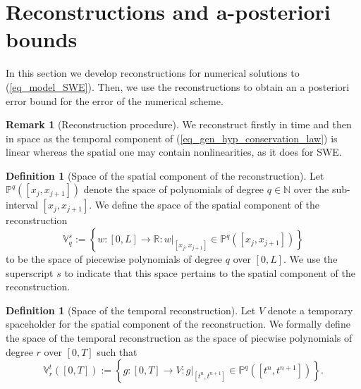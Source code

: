 \documentclass[12pt,a4paper]{article}
\numberwithin{equation}{section}
\theoremstyle{definition}
\newcommand{\polygsna}[2]{\mathbb{P}^{#1}\qp{#2}}
\newcommand{\qp}[1]{\left(#1\right)}
\newcommand{\qb}[1]{\left[#1\right]}
\newcommand{\bracegs}[1]{\left\lbrace#1\right\rbrace}
\newtheorem{Defn}[subsection]{Definition}
\newtheorem{Rem}[subsection]{Remark}
\begin{document}
\section{Reconstructions and a-posteriori bounds}\label{sec_bounds}
In this section we develop reconstructions for numerical solutions to (\ref{eq_model_SWE}).  Then, we use the reconstructions to obtain an a posteriori error bound for the error of the numerical scheme.  

\begin{Rem}[Reconstruction procedure]
We reconstruct firstly in time and then in space as the temporal component of (\ref{eq_gen_hyp_conservation_law}) is linear whereas the spatial one may contain nonlinearities, as it does for SWE.
\end{Rem}
\begin{Defn}[Space of the spatial component of the reconstruction]
Let $\polygsna{q}{\qb{x_j, x_{j+1}}}$  denote the space of polynomials of degree $q\in\mathbb{N}$ over the sub-interval $\qb{x_j, x_{j+1}}$.  We define the space of the spatial component of the reconstruction 
\begin{equation}
\mathbb{V}_q^s:=\bracegs{w:\qb{0,L}\rightarrow\mathbb{R}: w|_{\qb{x_j,x_{j+1}}}\in \polygsna{q}{\qb{x_j, x_{j+1}}}}
\end{equation}
to be the space of piecewise polynomials of degree $q$ over $\qb{0,L}$.  We use the superscript $s$ to indicate that this space pertains to the spatial component of the reconstruction.
\end{Defn}

\begin{Defn}[Space of the temporal reconstruction]
 Let $V$ denote a temporary spaceholder for the spatial component of the reconstruction. We formally define the space of the temporal reconstruction as the space of piecwise polynomials of degree $r$ over $\qb{0,T}$ such that
\begin{equation}
\mathbb{V}_r^t\qp{\qb{0,T}}:=\bracegs{g:\qb{0,T}\rightarrow V: g|_{\qb{t^n, t^{n+1}}}\in \polygsna{q}{\qb{t^n, t^{n+1}}}}.
\end{equation}
\end{Defn}
 
\end{document}
